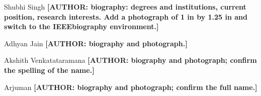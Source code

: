 \documentclass{ieeeaccess}
\newcommand{\authorfill}[1]{\textbf{[AUTHOR: #1]}}
\begin{document}



\begin{IEEEbiographynophoto}{Shubhi Singh}
\authorfill{biography: degrees and institutions, current position, research interests. Add a photograph of 1 in by 1.25 in and switch to the IEEEbiography environment.}
\end{IEEEbiographynophoto}

\begin{IEEEbiographynophoto}{Adhyan Jain}
\authorfill{biography and photograph.}
\end{IEEEbiographynophoto}

\begin{IEEEbiographynophoto}{Akshith Venkatataramana}
\authorfill{biography and photograph; confirm the spelling of the name.}
\end{IEEEbiographynophoto}

\begin{IEEEbiographynophoto}{Arjuman}
\authorfill{biography and photograph; confirm the full name.}
\end{IEEEbiographynophoto}

\EOD
\end{document}
